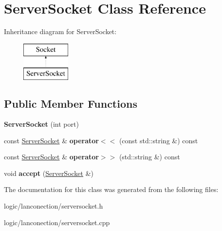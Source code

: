 \hypertarget{class_server_socket}{\section{Server\-Socket Class Reference}
\label{class_server_socket}
}
Inheritance diagram for Server\-Socket\-:\begin{figure}[H]
\begin{center}
\leavevmode
\includegraphics[height=2.000000cm]{class_server_socket}
\end{center}
\end{figure}
\subsection*{Public Member Functions}
\begin{DoxyCompactItemize}
\item 
\hypertarget{class_server_socket_a3dc1a31f740e4a8d69ae10c5dcb547d6}{{\bfseries Server\-Socket} (int port)}\label{class_server_socket_a3dc1a31f740e4a8d69ae10c5dcb547d6}

\item 
\hypertarget{class_server_socket_ab5fe4b2d92d7014f7663c1bbacbbeda5}{const \hyperlink{class_server_socket}{Server\-Socket} \& {\bfseries operator$<$$<$} (const std\-::string \&) const }\label{class_server_socket_ab5fe4b2d92d7014f7663c1bbacbbeda5}

\item 
\hypertarget{class_server_socket_a6bfabf01766bdb2c7f53274d8d771212}{const \hyperlink{class_server_socket}{Server\-Socket} \& {\bfseries operator$>$$>$} (std\-::string \&) const }\label{class_server_socket_a6bfabf01766bdb2c7f53274d8d771212}

\item 
\hypertarget{class_server_socket_ae550e314a988575d05b1dec1c3c18020}{void {\bfseries accept} (\hyperlink{class_server_socket}{Server\-Socket} \&)}\label{class_server_socket_ae550e314a988575d05b1dec1c3c18020}

\end{DoxyCompactItemize}


The documentation for this class was generated from the following files\-:\begin{DoxyCompactItemize}
\item 
logic/lanconection/serversocket.\-h\item 
logic/lanconection/serversocket.\-cpp\end{DoxyCompactItemize}
